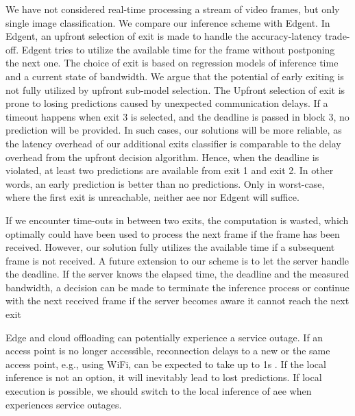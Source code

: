 We have not considered real-time processing a stream of video frames, but only single image classification. We compare our inference scheme with Edgent. In Edgent, an upfront selection of exit is made to handle the accuracy-latency trade-off. Edgent tries to utilize the available time for the frame without postponing the next one. The choice of exit is based on regression models of inference time and a current state of bandwidth.  We argue that the potential of early exiting is not fully utilized by upfront sub-model selection. The Upfront selection of exit is prone to losing predictions caused by unexpected communication delays. If a timeout happens when exit 3 is selected, and the deadline is passed in block 3, no prediction will be provided.  In such cases, our solutions will be more reliable, as the latency overhead of our additional exits classifier is comparable to the delay overhead from the upfront decision algorithm. Hence, when the deadline is violated, at least two predictions are available from exit 1 and exit 2. In other words, an early prediction is better than no predictions. Only in worst-case, where the first exit is unreachable, neither \gls{aee} nor Edgent will suffice. 

If we encounter time-outs in between two exits, the computation is wasted, which optimally could have been used to process the next frame if the frame has been received. However, our solution fully utilizes the available time if a subsequent frame is not received. A future extension to our scheme is to let the server handle the deadline. If the server knows the elapsed time, the deadline and the measured bandwidth, a decision can be made to terminate the inference process or continue with the next received frame if the server becomes aware it cannot reach the next exit  

Edge and cloud offloading can potentially experience a service outage. If an access point is no longer accessible, reconnection delays to a new or the same access point, e.g., using WiFi, can be expected to take up to 1s \cite{pei_why_2017}. If the local inference is not an option, it will inevitably lead to lost predictions. If local execution is possible, we should switch to the local inference of \gls{aee} when experiences service outages. 
